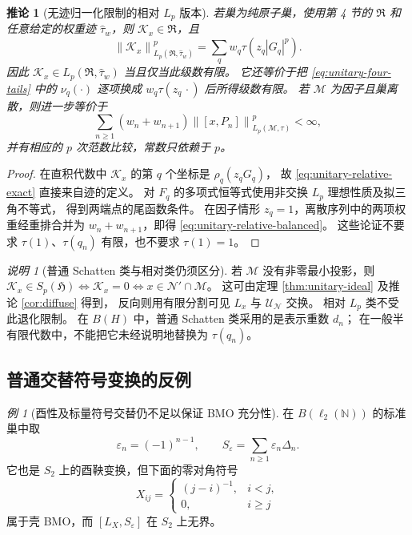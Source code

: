 \documentclass[UTF8,11pt,a4paper,fontset=fandol]{ctexart}
\newtheorem{corollary}[theorem]{推论}
\theoremstyle{remark}
\newtheorem{remark}[theorem]{说明}
\newtheorem{example}[theorem]{例}
\numberwithin{equation}{section}
\newcommand{\M}{\mathcal M}
\newcommand{\N}{\mathcal N}
\newcommand{\HH}{\mathfrak H}
\newcommand{\norm}[1]{\left\lVert #1\right\rVert}
\begin{document}
\begin{corollary}[无迹归一化限制的相对 $L_p$ 版本]\label{cor:unitary-relative}
若巢为纯原子巢，使用第 4 节的 $\mathfrak R$ 和任意给定的权重迹
$\widehat\tau_w$，则 $\mathcal K_x\in\mathfrak R$，且
\begin{equation}\label{eq:unitary-relative-exact}
 \norm{\mathcal K_x}_{L_p(\mathfrak R,\widehat\tau_w)}^p
 =\sum_qw_q\tau(z_q|G_q|^p).
\end{equation}
因此 $\mathcal K_x\in L_p(\mathfrak R,\widehat\tau_w)$ 当且仅当此级数有限。
它还等价于把 \eqref{eq:unitary-four-tails} 中的 $\nu_q(\cdot)$
逐项换成 $w_q\tau(z_q\,\cdot)$ 后所得级数有限。
若 $\M$ 为因子且巢离散，则进一步等价于
\begin{equation}\label{eq:unitary-relative-balanced}
 \sum_{n\geq1}(w_n+w_{n+1})
       \norm{[x,P_n]}_{L_p(\M,\tau)}^p<\infty,
\end{equation}
并有相应的 $p$ 次范数比较，常数只依赖于 $p$。
\end{corollary}

\begin{proof}
在直积代数中 $\mathcal K_x$ 的第 $q$ 个坐标是 $\rho_q(z_qG_q)$，
故 \eqref{eq:unitary-relative-exact} 直接来自迹的定义。
对 $F_q$ 的多项式恒等式使用非交换 $L_p$ 理想性质及拟三角不等式，
得到两端点的尾函数条件。
在因子情形 $z_q=1$，离散序列中的两项权重经重排合并为
$w_n+w_{n+1}$，即得 \eqref{eq:unitary-relative-balanced}。
这些论证不要求 $\tau(1)$、$\tau(q_n)$ 有限，也不要求 $\tau(1)=1$。
\end{proof}

\begin{remark}[普通 Schatten 类与相对类仍须区分]
若 $\M$ 没有非零最小投影，则
$\mathcal K_x\in S_p(\HH)\iff\mathcal K_x=0\iff x\in\N'\cap\M$。
这可由定理 \ref{thm:unitary-ideal} 及推论 \ref{cor:diffuse} 得到，
反向则用有限分割可见 $L_x$ 与 $\mathcal U_\N$ 交换。
相对 $L_p$ 类不受此退化限制。
在 $B(H)$ 中，普通 Schatten 类采用的是表示重数 $d_n$；
在一般半有限代数中，不能把它未经说明地替换为 $\tau(q_n)$。
\end{remark}

\subsection{普通交替符号变换的反例}

\begin{example}[酉性及标量符号交替仍不足以保证 BMO 充分性]\label{ex:scalar-signs}
在 $B(\ell_2(\mathbb N))$ 的标准巢中取
\[
 \varepsilon_n=(-1)^{n-1},\qquad
 S_\varepsilon=\sum_{n\geq1}\varepsilon_n\Delta_n.
\]
它也是 $S_2$ 上的酉鞅变换，但下面的零对角符号
\[
 X_{ij}=\begin{cases}(j-i)^{-1},&i<j,\\0,&i\geq j\end{cases}
\]
属于壳 BMO，而 $[L_X,S_\varepsilon]$ 在 $S_2$ 上无界。
\end{example}
\end{document}
